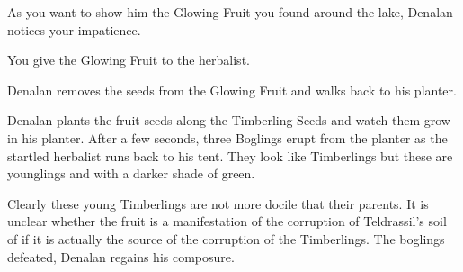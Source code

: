 
As you want to show him the Glowing Fruit you found around the lake, Denalan notices your impatience.


You give the Glowing Fruit to the herbalist.


Denalan removes the seeds from the Glowing Fruit and walks back to his planter.


Denalan plants the fruit seeds along the Timberling Seeds and watch them grow in his planter. After a few seconds, three Boglings erupt from the planter as the startled herbalist runs back to his tent. They look like Timberlings but these are younglings and with a darker shade of green.


Clearly these young Timberlings are not more docile that their parents. It is unclear whether the fruit is a manifestation of the corruption of Teldrassil's soil of if it is actually the source of the corruption of the Timberlings. The boglings defeated, Denalan regains his composure.

